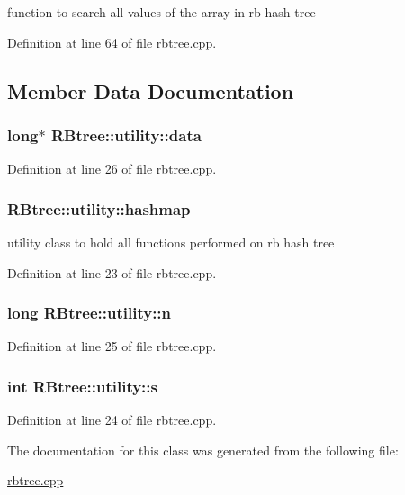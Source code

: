 function to search all values of the array in rb hash tree 



Definition at line 64 of file rbtree.\-cpp.



\subsection{Member Data Documentation}
\hypertarget{class_r_btree_1_1utility_a2c6a4627975374aaaab918410de71cb4}{
\subsubsection[{data}]{\setlength{\rightskip}{0pt plus 5cm}long$\ast$ R\-Btree\-::utility\-::data}}\label{class_r_btree_1_1utility_a2c6a4627975374aaaab918410de71cb4}


Definition at line 26 of file rbtree.\-cpp.

\hypertarget{class_r_btree_1_1utility_ac65c2fb7a6c687d5146763b3e7b10957}{
\subsubsection[{hashmap}]{ R\-Btree\-::utility\-::hashmap}}\label{class_r_btree_1_1utility_ac65c2fb7a6c687d5146763b3e7b10957}


utility class to hold all functions performed on rb hash tree 



Definition at line 23 of file rbtree.\-cpp.

\hypertarget{class_r_btree_1_1utility_a5f8d03fdb96145436e2b44275f49b3ab}{
\subsubsection[{n}]{\setlength{\rightskip}{0pt plus 5cm}long R\-Btree\-::utility\-::n}}\label{class_r_btree_1_1utility_a5f8d03fdb96145436e2b44275f49b3ab}


Definition at line 25 of file rbtree.\-cpp.

\hypertarget{class_r_btree_1_1utility_a72cdc88933c671dba14c2e8a34685f69}{
\subsubsection[{s}]{\setlength{\rightskip}{0pt plus 5cm}int R\-Btree\-::utility\-::s}}\label{class_r_btree_1_1utility_a72cdc88933c671dba14c2e8a34685f69}


Definition at line 24 of file rbtree.\-cpp.



The documentation for this class was generated from the following file\-:\begin{DoxyCompactItemize}
\item 
\hyperlink{rbtree_8cpp}{rbtree.\-cpp}\end{DoxyCompactItemize}
